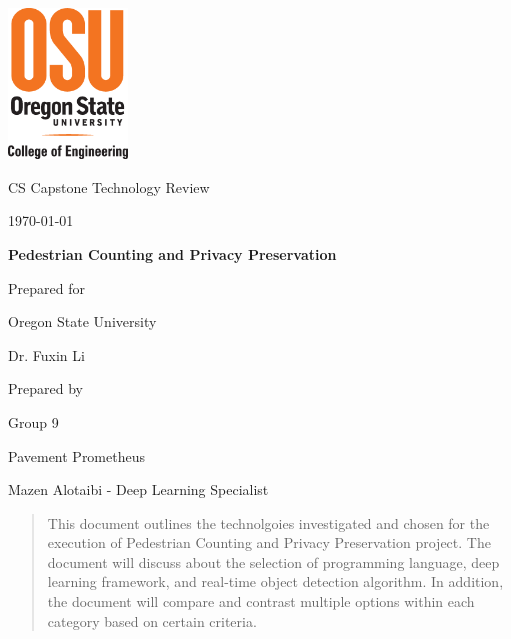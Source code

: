 \documentclass[onecolumn, draftclsnofoot,10pt, compsoc]{IEEEtran}
\def \CapstoneTeamName{		Pavement Prometheus}
\def \CapstoneTeamNumber{		9}
\def \GroupMemberTwo{			Mazen Alotaibi }
\def \CapstoneProjectName{		Pedestrian Counting and Privacy Preservation}
\def \CapstoneSponsorCompany{	Oregon State University}
\def \CapstoneSponsorPerson{		Dr. Fuxin Li}
\def \DocType{		%
				Technology Review
				}
\newcommand{\NameSigPair}[1]{\par
\makebox[2.75in][r]{#1} \hfil 	\makebox[3.25in]{\makebox[2.25in]{\hrulefill} \hfill		\makebox[.75in]{\hrulefill}}
\par\vspace{-12pt} \textit{\tiny\noindent
\makebox[2.75in]{} \hfil		\makebox[3.25in]{\makebox[2.25in][r]{Signature} \hfill	\makebox[.75in][r]{Date}}}}
\renewcommand{\NameSigPair}[1]{#1}
\begin{document}
\begin{titlepage}
    \begin{singlespace}
    	\includegraphics[height=4cm]{coe_v_spot1}
        \hfill 
        \par\vspace{.2in}
        \centering
        \scshape{
            \huge CS Capstone \DocType \par
            {\large\today}\par
            \vspace{.5in}
            \textbf{\Huge\CapstoneProjectName}\par
            {\large Prepared for}\par
            \Huge \CapstoneSponsorCompany\par
            \vspace{5pt}
            {\Large\NameSigPair{\CapstoneSponsorPerson}\par}
            {\large Prepared by }\par
            Group\CapstoneTeamNumber\par
            \CapstoneTeamName\par 
            \vspace{5pt}
            {\Large
                \NameSigPair{\GroupMemberTwo - Deep Learning Specialist}\par
            }
            \vspace{20pt}
        }
        \begin{abstract}
        This document outlines the technolgoies investigated and chosen for the execution of Pedestrian Counting and Privacy Preservation project. The document will discuss about the selection of programming language, deep learning framework, and real-time object detection algorithm. In addition, the document will compare and contrast multiple options within each category based on certain criteria.
        \end{abstract}     
    \end{singlespace}
\end{titlepage}
\newpage
{}
\tableofcontents
\clearpage
\end{document}
